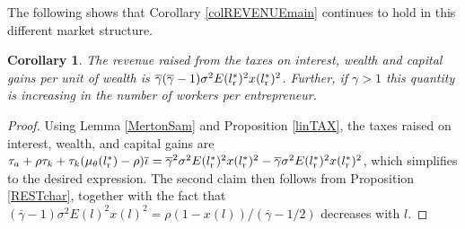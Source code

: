 \documentclass[11pt]{article}
\theoremstyle{plain}
\newtheorem{corl}[thm]{Corollary}
\begin{document}
The following shows that Corollary \ref{colREVENUEmain} continues to hold in this different market structure. 

\begin{corl}\label{colREVENUE}
The revenue raised from the taxes on interest, wealth and capital gains per unit of wealth is $\overline{\gamma}(\overline{\gamma}-1) \sigma^2 E(l_{\textnormal{r}}^*)^2 x(l_{\textnormal{r}}^*)^2$. Further, if $\gamma>1$ this quantity is increasing in the number of workers per entrepreneur. 
\end{corl}

\begin{proof}
Using Lemma \ref{MertonSam} and Proposition \ref{linTAX}, the taxes raised on interest, wealth, and capital gains are $\tau_a + \rho \tau_k + \tau_k(\mu_{\theta}(l_{\textnormal{r}}^*) - \rho)\overline{\iota} = \overline{\gamma}^2 \sigma^2 E(l_{\textnormal{r}}^*)^2 x(l_{\textnormal{r}}^*)^2 -\overline{\gamma} \sigma^2 E(l_{\textnormal{r}}^*)^2 x(l_{\textnormal{r}}^*)^2$, which simplifies to the desired expression. The second claim then follows from Proposition \ref{RESTchar}, together with the fact that $(\overline{\gamma}-1) \sigma^2 E(l)^2 x(l)^2 = \rho(1- x(l))/(\overline{\gamma}-1/2)$ decreases with $l$.
\end{proof} %

\end{document}

